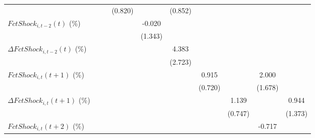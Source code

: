 {\begin{tabular}{l*{9}{c}}
                    &                     &                     &     (0.820)         &                     &     (0.852)         &                     &                     &                     &                     \\
\addlinespace
$ FctShock_{i,t-2}(t)$ (\%)&                     &                     &                     &      -0.020         &                     &                     &                     &                     &                     \\
                    &                     &                     &                     &     (1.343)         &                     &                     &                     &                     &                     \\
\addlinespace
$ \Delta FctShock_{i,t-2}(t)$ (\%)&                     &                     &                     &                     &       4.383         &                     &                     &                     &                     \\
                    &                     &                     &                     &                     &     (2.723)         &                     &                     &                     &                     \\
\addlinespace
$ FctShock_{i,t}(t+1)$ (\%)&                     &                     &                     &                     &                     &       0.915         &                     &       2.000         &                     \\
                    &                     &                     &                     &                     &                     &     (0.720)         &                     &     (1.678)         &                     \\
\addlinespace
$ \Delta FctShock_{i,t}(t+1)$ (\%)&                     &                     &                     &                     &                     &                     &       1.139         &                     &       0.944         \\
                    &                     &                     &                     &                     &                     &                     &     (0.747)         &                     &     (1.373)         \\
\addlinespace
$ FctShock_{i,t}(t+2)$ (\%)&                     &                     &                     &                     &                     &                     &                     &      -0.717         &                     \\

\end{tabular}}
